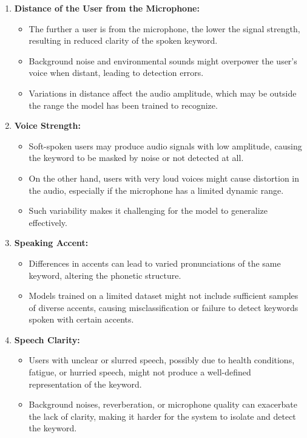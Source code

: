 \begin{enumerate}
	\item \textbf{Distance of the User from the Microphone:} 
	\begin{itemize}
		\item The further a user is from the microphone, the lower the signal strength, resulting in reduced clarity of the spoken keyword. 
		\item Background noise and environmental sounds might overpower the user's voice when distant, leading to detection errors.
		\item Variations in distance affect the audio amplitude, which may be outside the range the model has been trained to recognize.
	\end{itemize}
	
	\item \textbf{Voice Strength:}
	\begin{itemize}
		\item Soft-spoken users may produce audio signals with low amplitude, causing the keyword to be masked by noise or not detected at all.
		\item On the other hand, users with very loud voices might cause distortion in the audio, especially if the microphone has a limited dynamic range.
		\item Such variability makes it challenging for the model to generalize effectively.
	\end{itemize}
	
	\item \textbf{Speaking Accent:}
	\begin{itemize}
		\item Differences in accents can lead to varied pronunciations of the same keyword, altering the phonetic structure.
		\item Models trained on a limited dataset might not include sufficient samples of diverse accents, causing misclassification or failure to detect keywords spoken with certain accents.
	\end{itemize}
	
	\item \textbf{Speech Clarity:}
	\begin{itemize}
		\item Users with unclear or slurred speech, possibly due to health conditions, fatigue, or hurried speech, might not produce a well-defined representation of the keyword.
		\item Background noises, reverberation, or microphone quality can exacerbate the lack of clarity, making it harder for the system to isolate and detect the keyword.
	\end{itemize}
	

\end{enumerate}
